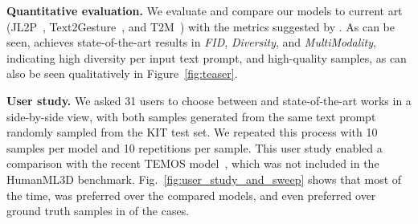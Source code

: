 \textbf{Quantitative evaluation.} We evaluate and compare our models to current art (JL2P~\citet{ahuja2019language2pose}, Text2Gesture~\citep{bhattacharya2021text2gestures}, and T2M~\citep{guo2022generating}) with the metrics suggested by \citet{guo2022generating}. 
As can be seen, \ourmethod{} achieves state-of-the-art results in \textit{FID}, \textit{Diversity}, and \textit{MultiModality}, indicating high diversity per input text prompt, and high-quality samples, as can also be seen qualitatively in Figure~\ref{fig:teaser}.

\textbf{User study.} We asked 31 users to choose between \ourmethod{} and 
state-of-the-art works
in a side-by-side view, with both samples generated from the same text prompt randomly sampled from the KIT test set. We repeated this process with 10 samples per model and 10 repetitions per sample. 
This user study enabled a comparison with the recent TEMOS model~\citep{petrovich22temos}, which was not included in the HumanML3D benchmark.
Fig.~\ref{fig:user_study_and_sweep} shows that most of the time, \ourmethod{} was preferred over the compared models, and even preferred over ground truth samples in  of the cases.


